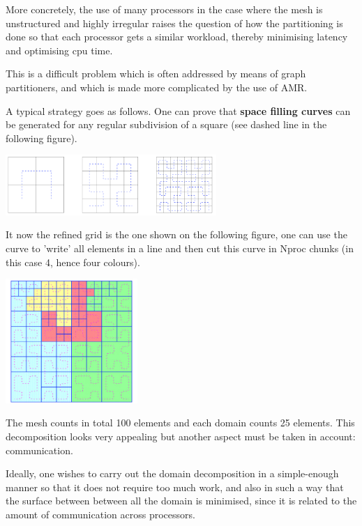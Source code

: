 More concretely, the use of many processors in the case where the mesh is unstructured and highly irregular 
raises the question of how the partitioning is done so that each processor gets a similar workload, thereby 
minimising latency and optimising cpu time.

This is a difficult problem which is often addressed by means of graph partitioners, and which is made 
more complicated by the use of AMR. 

A typical strategy goes as follows. One can prove that {\bf space filling curves}
can be generated for any regular subdivision of a square (see dashed line in the following
figure).

\begin{center}
\includegraphics[width=8cm]{images/parallel/sfc1}
\end{center}

It now the refined grid is the one shown on the following figure, one can use the curve to 'write'
all elements in a line and then cut this curve in Nproc chunks (in this case 4, hence four colours).

\begin{center}
\includegraphics[width=5cm]{images/parallel/sfc2}
\end{center}

The mesh counts in total 100 elements and each domain counts 25 elements. 
This decomposition looks very appealing but another aspect must be taken in account:
communication.

Ideally, one wishes to carry out the domain decomposition in a simple-enough manner so that 
it does not require too much work, and also in such a way that the surface between between 
all the domain is minimised, since it is related to the amount of communication 
across processors.  

